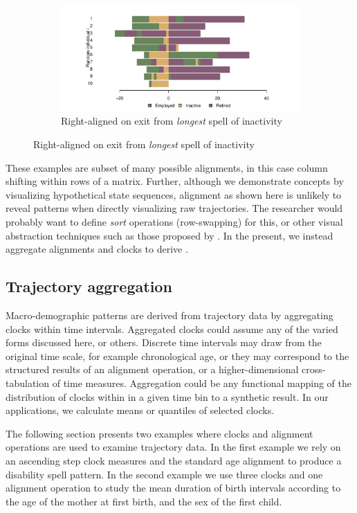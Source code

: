 \documentclass[a4paper,left=1.25cm,right=1.25cm,top=1.25cm,bottom=1.25cm]{article}
\begin{document}
\begin{figure}[ht!]
\begin{subfigure}{\textwidth}
\centering
\caption{Right-aligned on exit from \emph{longest} spell of inactivity}
\label{fig:longinactright}
\includegraphics[scale=.5]{Figures/Seq10inactlongright.pdf}
\end{subfigure}

\end{figure}

These examples are subset of many possible alignments, in this case column shifting within rows of a matrix. Further, although we demonstrate concepts by visualizing hypothetical state sequences, alignment as shown here is unlikely to reveal patterns when directly visualizing raw trajectories. The researcher would probably want to define \emph{sort} operations (row-swapping) for this, or other visual abstraction techniques such as those proposed by \citet[e.g.][]{fasang2014visualizing}. In the present, we instead aggregate alignments and clocks to derive .

\FloatBarrier
\subsection{Trajectory aggregation}
Macro-demographic patterns are derived from trajectory data by aggregating clocks within time intervals. Aggregated clocks could assume any of the varied forms discussed here, or others. Discrete time intervals may draw from the original time scale, for example chronological age, or they may correspond to the structured results of an alignment operation, or a higher-dimensional cross-tabulation of time measures. Aggregation could be any functional mapping of the distribution of clocks within in a given time bin to a synthetic result. In our applications, we calculate means or quantiles of selected clocks.

The following section presents two examples where clocks and alignment operations are used to examine trajectory data. In the first example we rely on an ascending step clock measures and the standard age alignment to produce a disability spell pattern. In the second example we use three clocks and one alignment operation to study the mean duration of birth intervals according to the age of the mother at first birth, and the sex of the first child.
\end{document}
